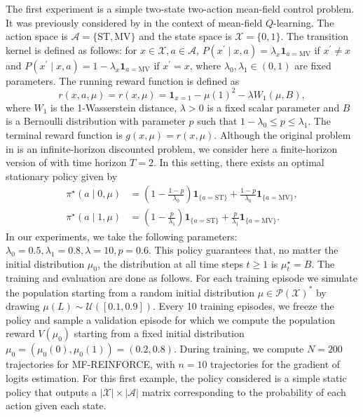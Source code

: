 \documentclass[11pt]{article}
\numberwithin{equation}{section}
\theoremstyle{definition}
\theoremstyle{remark}
\def\cA{\mathcal{A}}
\def\cX{\mathcal{X}}
\def\mv{{\mathrm{MV}}}
\def\st{{\mathrm{ST}}}
\begin{document}
The first experiment is a simple two-state two-action mean-field control problem. 
It was previously considered by \cite{gu2023dynamic} in the context of mean-field $Q$-learning.
The action space is $\cA = \{ \st, \mv \}$ and the state space is $\cX = \{0,1\}$.
The transition kernel is defined as follows: for $x \in \cX, a \in \cA$, $P(x^\prime \mid x, a) = \lambda_x \mathbf 1_{a = \mv}$ if $x^\prime \neq x$ and 
$P(x^\prime \mid x, a) = 1 - \lambda_x \mathbf 1_{a = \mv}$ if $x^\prime = x$, where $\lambda_0, \lambda_1 \in (0,1)$ are fixed parameters.
The running reward function is defined as
\[
r(x,a,\mu) = r(x, \mu) = \mathbf 1_{x = 1} - \mu(1)^2 - \lambda W_1(\mu, B),
\]
where $W_1$ is the 1-Wasserstein distance, $\lambda > 0$ is a fixed scalar parameter and $B$ is a Bernoulli distribution with parameter $p$ such that $1- \lambda_0  \leq p \leq \lambda_1$.
The terminal reward function is $g(x, \mu) = r(x, \mu)$.
Although the original problem in \cite{gu2023dynamic} is an infinite-horizon discounted problem, we consider here a finite-horizon version of with time horizon $T=2$.
In this setting, there exists an optimal stationary policy given by
\begin{equation}
\label{eq:optimal-policy-example31}
\begin{aligned}
    \pi^\star(a \mid 0, \mu) &= \left(1-\frac{1-p}{\lambda_0}\right) \mathbf{1}_{\{a=\st\}}+\frac{1-p}{\lambda_0} \mathbf{1}_{\{a=\mv\}}, \\
   \pi^\star(a \mid 1, \mu) &= \left(1-\frac{p}{\lambda_1}\right) \mathbf{1}_{\{a=\mathrm{ST}\}}+\frac{p}{\lambda_1} \mathbf{1}_{\{a=\mathrm{MV}\}}.
\end{aligned}
\end{equation}
In our experiments, we take the following parameters:
$\lambda_0 = 0.5, \lambda_1 = 0.8, \lambda= 10, p = 0.6$.
This policy guarantees that, no matter the initial distribution $\mu_0$, the distribution at all time steps $t \geq 1$ is $\mu_t^\star = B$.
The training and evaluation are done as follows.
For each training episode we simulate the population starting from a random initial distribution $\mu\in \mathcal P (\cX)^*$ by drawing $\mu(L) \sim \mathcal U ([0.1,0.9])$. 
Every 10 training episodes, we freeze the policy and sample a validation episode for which we compute the population reward $V(\mu_0)$ starting from a fixed initial distribution $\mu_0 = (\mu_0(0), \mu_0(1)) = (0.2,0.8)$.
During training, we compute $N = 200$ trajectories for MF-REINFORCE, with $n = 10$ trajectories for the gradient of logits estimation. 
For this first example, the policy considered is a simple static policy that outputs a $| \cX| \times | \cA |$ matrix corresponding to the probability of each action given each state.
\end{document}
